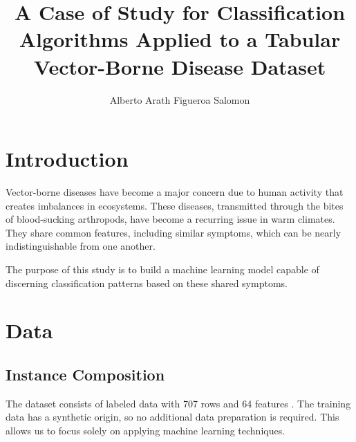 \documentclass{article}
\title{A Case of Study for Classification Algorithms Applied to a Tabular Vector-Borne Disease Dataset}
\author{Alberto Arath Figueroa Salomon}
\begin{document}
\maketitle

\section{Introduction}

Vector-borne diseases have become a major concern due to human activity that creates imbalances
in ecosystems. These diseases, transmitted through the bites of blood-sucking arthropods, have
become a recurring issue in warm climates. They share common features, including similar symptoms,
which can be nearly indistinguishable from one another.

The purpose of this study is to build a machine learning model capable of discerning classification
patterns based on these shared symptoms.

\section{Data}

\subsection{Instance Composition}

The dataset consists of labeled data with 707 rows and 64 features \cite{disease_dataset2023}. 
The training data has a synthetic origin, so no additional data preparation is required. 
This allows us to focus solely on applying machine learning techniques.


\begin{table}[h!] %
\centering
\renewcommand{\arraystretch}{1.2} %
\caption{Sample training set with a subset of features.}
\label{tab:sample_training}
\end{table}
\end{document}
